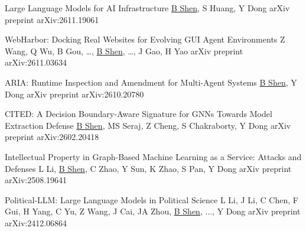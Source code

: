 \begingroup
\renewcommand{\MaxNumberedItem}{[99]}


\BigGap
\NumberedItem{[6]}
{\PaperEntry
    {Large Language Models for AI Infrastructure}
    {\underline{B Shen}, S Huang, Y Dong}
    {arXiv preprint}
    {arXiv:2611.19061}
    {}
}


\BigGap
\NumberedItem{[5]}
{\PaperEntry
    {WebHarbor: Docking Real Websites for Evolving GUI Agent Environments}
    {Z Wang, Q Wu, B Gou, …, \underline{B Shen}, …, J Gao, H Yao}
    {arXiv preprint}
    {arXiv:2611.03634}
    {}
}


\BigGap
\NumberedItem{[4]}
{\PaperEntry
    {ARIA: Runtime Inspection and Amendment for Multi-Agent Systems}
    {\underline{B Shen}, Y Dong}
    {arXiv preprint}
    {arXiv:2610.20780}
    {}
}


\BigGap
\NumberedItem{[3]}
{\PaperEntry
    {CITED: A Decision Boundary-Aware Signature for GNNs Towards Model Extraction Defense}
    {\underline{B Shen}, MS Seraj, Z Cheng, S Chakraborty, Y Dong}
    {arXiv preprint}
    {arXiv:2602.20418}
    {}
}


\BigGap
\NumberedItem{[2]}
{\PaperEntry
    {Intellectual Property in Graph-Based Machine Learning as a Service: Attacks and Defenses}
    {L Li, \underline{B Shen}, C Zhao, Y Sun, K Zhao, S Pan, Y Dong}
    {arXiv preprint}
    {arXiv:2508.19641}
    {}
}


\BigGap
\NumberedItem{[1]}
{\PaperEntry
    {Political-LLM: Large Language Models in Political Science}
    {L Li, J Li, C Chen, F Gui, H Yang, C Yu, Z Wang, J Cai, JA Zhou, \underline{B Shen}, ..., Y Dong}
    {arXiv preprint}
    {arXiv:2412.06864}
    {}
}

\endgroup
